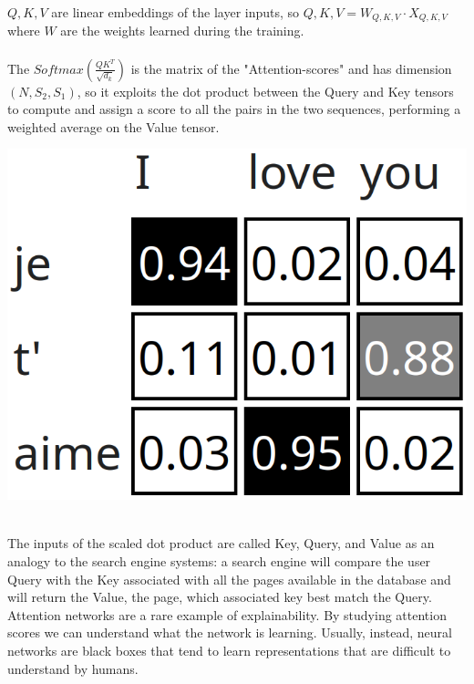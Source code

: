 \begin{minipage}{\linewidth}
    \begin{minipage}{0.53\linewidth}
        $Q,K,V$ are linear embeddings of the layer inputs, so $Q,K,V=W_{Q,K,V} \cdot X_{Q,K,V}$ where $W$ are the weights learned during the training.\\
        \\
        The $\textit{Softmax}\left(\frac{QK^T}{\sqrt{d_k}}\right)$ is the matrix of the "Attention-scores" and has dimension $(N,S_2,S_1)$, so it exploits the dot product between the Query and Key tensors to compute and assign a score to all the pairs in the two sequences, performing a weighted average on the Value tensor.\\
    \end{minipage}
    \hfill
    \begin{minipage}{0.43\linewidth}
        \vspace{-0.7cm}
        \centering
        \includegraphics[width=0.5\linewidth]{fig//chap05-stats/translation.png}
        \vspace{0.6cm}
        \label{fig:Translation}
    \end{minipage}
\end{minipage}
\vspace{0.1cm}\\
The inputs of the scaled dot product are called Key, Query, and Value as an analogy to the search engine systems: a search engine will compare the user Query with the Key associated with all the pages available in the database and will return the Value, \ie the page, which associated key best match the Query.  
\\
Attention networks are a rare example of explainability. By studying attention scores we can understand what the network is learning. Usually, instead, neural networks are black boxes that tend to learn representations that are difficult to understand by humans.
